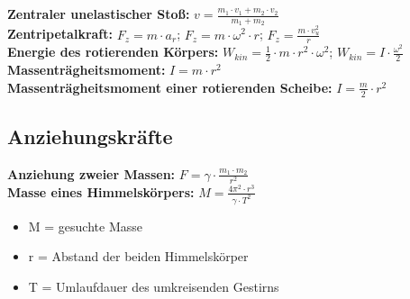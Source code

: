 \documentclass[eglish/german]{latex4ei/latex4ei_sheet}
\begin{document}
\begin{sectionbox}
					\textbf{Zentraler unelastischer Stoß:} $v = \frac{m_1 \cdot v_1 + m_2 \cdot v_2}{m_1+m_2}$\\
					\textbf{Zentripetalkraft:} $F_z = m \cdot a_r$; $F_z = m \cdot \omega^2 \cdot r$; $F_z = \frac{m \cdot v_u^2}{r}$\\
					\textbf{Energie des rotierenden Körpers:} $W_{kin}=\frac{1}{2} \cdot m \cdot r^2 \cdot \omega^2$;  $W_{kin} = I \cdot \frac{\omega^2}{2}$\\
					\textbf{Massenträgheitsmoment:} $I = m \cdot r^2$\\
					\textbf{Massenträgheitsmoment einer rotierenden Scheibe:} $I = \frac{m}{2}\cdot r^2$\\
					
				\end{sectionbox}
				\begin{sectionbox}
				\subsection{Anziehungskräfte}
					\textbf{Anziehung zweier Massen:} $F = \gamma \cdot \frac{m_1 \cdot m_2}{r^2}$\\
					\textbf{Masse eines Himmelskörpers:} $M = \frac{4\pi^2\cdot r^3}{\gamma \cdot T^2}$\\
					\begin{itemize}
						\item M = gesuchte Masse
						\item r = Abstand der beiden Himmelskörper
						\item T = Umlaufdauer des umkreisenden Gestirns
					\end{itemize}

				\end{sectionbox}
				
\end{document}
